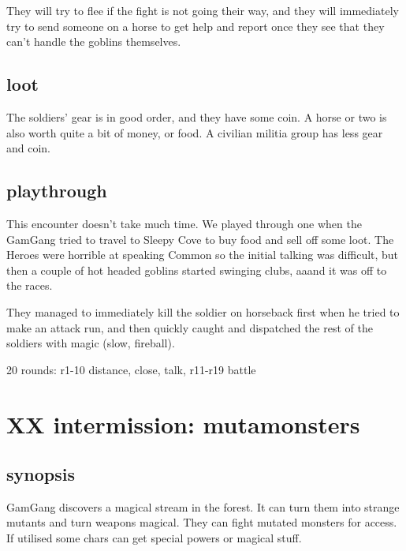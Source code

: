 They will try to flee if the fight is not going their way, and they will immediately try to send someone on a horse to get help and report once they see that they can't handle the goblins themselves.


\subsection*{loot}

The soldiers' gear is in good order, and they have some coin. A horse or two is also worth quite a bit of money, or food. A civilian militia group has less gear and coin.


\subsection*{playthrough}

This encounter doesn't take much time. We played through one when the GamGang tried to travel to Sleepy Cove to buy food and sell off some loot. The Heroes were horrible at speaking Common so the initial talking was difficult, but then a couple of hot headed goblins started swinging clubs, aaand it was off to the races.

They managed to immediately kill the soldier on horseback first when he tried to make an attack run, and then quickly caught and dispatched the rest of the soldiers with magic (slow, fireball).

20 rounds: r1-10 distance, close, talk, r11-r19 battle










\newpage
\section*{XX intermission: mutamonsters}


\subsection*{synopsis}

GamGang discovers a magical stream in the forest. It can turn them into strange mutants and turn weapons magical. They can fight mutated monsters for access. If utilised some chars can get special powers or magical stuff.


